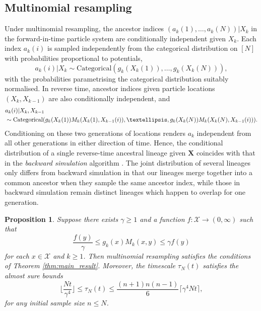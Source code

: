 \documentclass[a4paper,11pt]{article}
\newtheorem{prop}{Proposition}
\theoremstyle{definition}
\newcommand{\bfX}{\mathbf{X}}
\newcommand{\calX}{\mathcal{X}}
\begin{document}
\subsection{Multinomial resampling}

Under multinomial resampling, the ancestor indices $( a_k( 1 ), \ldots, a_k( N ) ) | X_k$ in the forward-in-time particle system are conditionally independent given $X_k$.
Each index $a_k(i)$ is sampled independently from the categorical distribution on $[N]$ with probabilities proportional to potentials,
\begin{equation}\label{eq:forward_weights}
a_k( i ) | X_k \sim \text{Categorical}( g_k( X_k( 1 ) ), \ldots, g_k( X_k( N ) ) ),
\end{equation}
with the probabilities parametrising the categorical distribution suitably normalised.
In reverse time, ancestor indices given particle locations $( X_k, X_{ k - 1 } )$ are also conditionally independent, and
\begin{align}
&a_k( i ) | X_k, X_{ k - 1 } \notag \\
&\sim \text{Categorical}( g_k( X_k( 1 ) ) M_k( X_k( 1 ), X_{ k - 1 }( i ) ), \ldots, g_k( X_k( N ) ) M_k( X_k( N ), X_{ k - 1 }( i ) ) ). \label{eq:reverse_weights}
\end{align}
Conditioning on these two generations of locations renders $a_k$ independent from all other generations in either direction of time.
Hence, the conditional distribution of a single reverse-time ancestral lineage given $\bfX$ coincides with that in the \emph{backward simulation} algorithm \cite{godsilletal:2004}.
The joint distribution of several lineages only differs from backward simulation in that our lineages merge together into a common ancestor when they sample the same ancestor index, while those in backward simulation remain distinct lineages which happen to overlap for one generation.

\begin{prop}\label{prop:multinomial}
Suppose there exists $\gamma \geq 1$ and a function $f : \calX \to ( 0, \infty )$ such that
\begin{equation}\label{eq:strong_mixing}
\frac{ f( y ) }{ \gamma } \leq g_k( x ) M_k( x, y ) \leq \gamma f( y )
\end{equation}
for each $x \in \calX$ and $k \geq 1$.
Then multinomial resampling satisfies the conditions of Theorem \ref{thm:main_result}.
Moreover, the timescale $\tau_N(t)$ satisfies the almost sure bounds
\begin{equation}\label{multinomial_timescale}
\Big\lfloor \frac{N t}{\gamma^4} \Big\rfloor \leq \tau_N(t) \leq \frac{(n + 1) n (n - 1) }{6} \lceil \gamma^4 N t \rceil,
\end{equation}
for any initial sample size $n \leq N$.
\end{prop}
\end{document}
